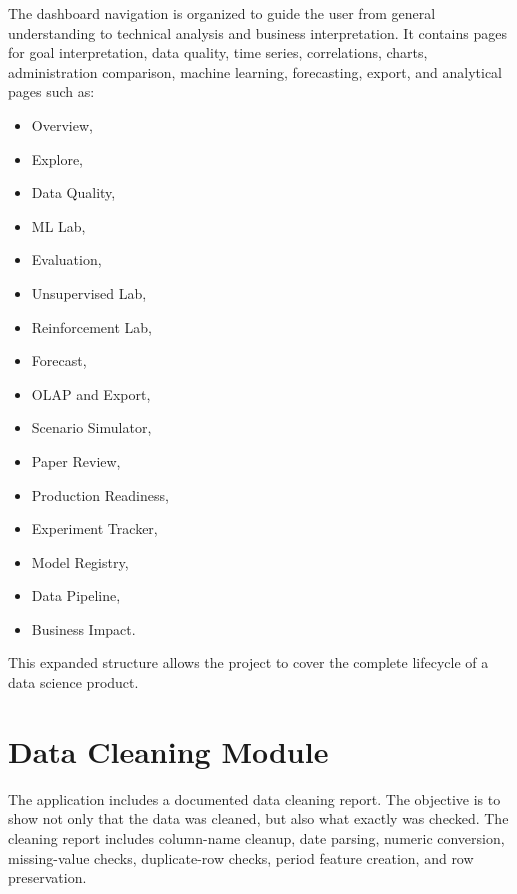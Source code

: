 The dashboard navigation is organized to guide the user from general understanding to technical analysis and business interpretation. It contains pages for goal interpretation, data quality, time series, correlations, charts, administration comparison, machine learning, forecasting, export, and analytical pages such as:
\begin{itemize}
\item Overview,
\item Explore,
\item Data Quality,
\item ML Lab,
\item Evaluation,
\item Unsupervised Lab,
\item Reinforcement Lab,
\item Forecast,
\item OLAP and Export,
\item Scenario Simulator,
\item Paper Review,
\item Production Readiness,
\item Experiment Tracker,
\item Model Registry,
\item Data Pipeline,
\item Business Impact.
\end{itemize}

This expanded structure allows the project to cover the complete lifecycle of a data science product.

\section{Data Cleaning Module}

The application includes a documented data cleaning report. The objective is to show not only that the data was cleaned, but also what exactly was checked. The cleaning report includes column-name cleanup, date parsing, numeric conversion, missing-value checks, duplicate-row checks, period feature creation, and row preservation.

